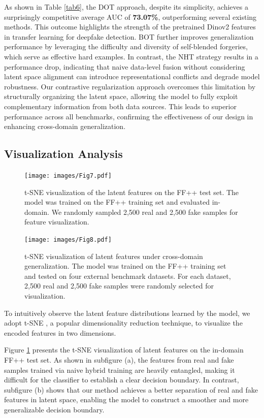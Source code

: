 \documentclass[final,5p,times]{elsarticle}
\begin{document}
As shown in Table \ref{tab6}, the DOT approach, despite its simplicity, achieves a surprisingly competitive average AUC of \textbf{73.07\%}, outperforming several existing methods. This outcome highlights the strength of the pretrained Dinov2 features in transfer learning for deepfake detection. BOT further improves generalization performance by leveraging the difficulty and diversity of self-blended forgeries, which serve as effective hard examples. In contrast, the NHT strategy results in a performance drop, indicating that naive data-level fusion without considering latent space alignment can introduce representational conflicts and degrade model robustness. Our contrastive regularization approach overcomes this limitation by structurally organizing the latent space, allowing the model to fully exploit complementary information from both data sources. This leads to superior performance across all benchmarks, confirming the effectiveness of our design in enhancing cross-domain generalization.


\subsection{Visualization Analysis}

\begin{figure}[htb]
\centering
\texttt{[image: images/Fig7.pdf]}
\caption{t-SNE visualization of the latent features on the FF++ test set. The model was trained on the FF++ training set and evaluated in-domain. We randomly sampled 2,500 real and 2,500 fake samples for feature visualization.} 
\label{Fig7}
\end{figure}

\begin{figure}[htb]
\centering
\texttt{[image: images/Fig8.pdf]}
\caption{t-SNE visualization of latent features under cross-domain generalization. The model was trained on the FF++ training set and tested on four external benchmark datasets. For each dataset, 2,500 real and 2,500 fake samples were randomly selected for visualization.} 
\label{Fig8}
\end{figure}

To intuitively observe the latent feature distributions learned by the model, we adopt t-SNE \cite{39}, a popular dimensionality reduction technique, to visualize the encoded features in two dimensions.

Figure \ref{Fig7} presents the t-SNE visualization of latent features on the in-domain FF++ test set. As shown in subfigure (a), the features from real and fake samples trained via naive hybrid training are heavily entangled, making it difficult for the classifier to establish a clear decision boundary. In contrast, subfigure (b) shows that our method achieves a better separation of real and fake features in latent space, enabling the model to construct a smoother and more generalizable decision boundary.
\end{document}
